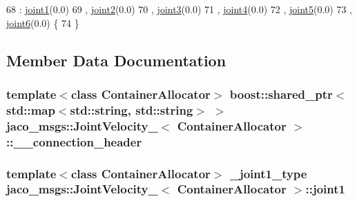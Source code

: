 \begin{DoxyCode}
68     : \hyperlink{structjaco__msgs_1_1JointVelocity___ac67bdfc1a5c298799a523d8a9ba4b87e}{joint1}(0.0)
69     , \hyperlink{structjaco__msgs_1_1JointVelocity___a4cb4b1f563bb3df4c9f2471f4682e33d}{joint2}(0.0)
70     , \hyperlink{structjaco__msgs_1_1JointVelocity___aa14dad415721aae4794da85ea545843f}{joint3}(0.0)
71     , \hyperlink{structjaco__msgs_1_1JointVelocity___a42d5c803c0510958d3ea50a5195fd430}{joint4}(0.0)
72     , \hyperlink{structjaco__msgs_1_1JointVelocity___af03f322785d0b58fbd4bd639ad48545c}{joint5}(0.0)
73     , \hyperlink{structjaco__msgs_1_1JointVelocity___ac4597081b297a5080198455fc6f13090}{joint6}(0.0)  \{
74     \}
\end{DoxyCode}


\subsection{Member Data Documentation}
\subsubsection[{\texorpdfstring{\+\_\+\+\_\+connection\+\_\+header}{__connection_header}}]{\setlength{\rightskip}{0pt plus 5cm}template$<$class Container\+Allocator$>$ boost\+::shared\+\_\+ptr$<$std\+::map$<$std\+::string, std\+::string$>$ $>$ {\bf jaco\+\_\+msgs\+::\+Joint\+Velocity\+\_\+}$<$ Container\+Allocator $>$\+::\+\_\+\+\_\+connection\+\_\+header}\hypertarget{structjaco__msgs_1_1JointVelocity___a25b3f657d79262342a571595d6ece714}{}\label{structjaco__msgs_1_1JointVelocity___a25b3f657d79262342a571595d6ece714}
\subsubsection[{\texorpdfstring{joint1}{joint1}}]{\setlength{\rightskip}{0pt plus 5cm}template$<$class Container\+Allocator$>$ {\bf \+\_\+joint1\+\_\+type} {\bf jaco\+\_\+msgs\+::\+Joint\+Velocity\+\_\+}$<$ Container\+Allocator $>$\+::joint1}\hypertarget{structjaco__msgs_1_1JointVelocity___ac67bdfc1a5c298799a523d8a9ba4b87e}{}\label{structjaco__msgs_1_1JointVelocity___ac67bdfc1a5c298799a523d8a9ba4b87e}
